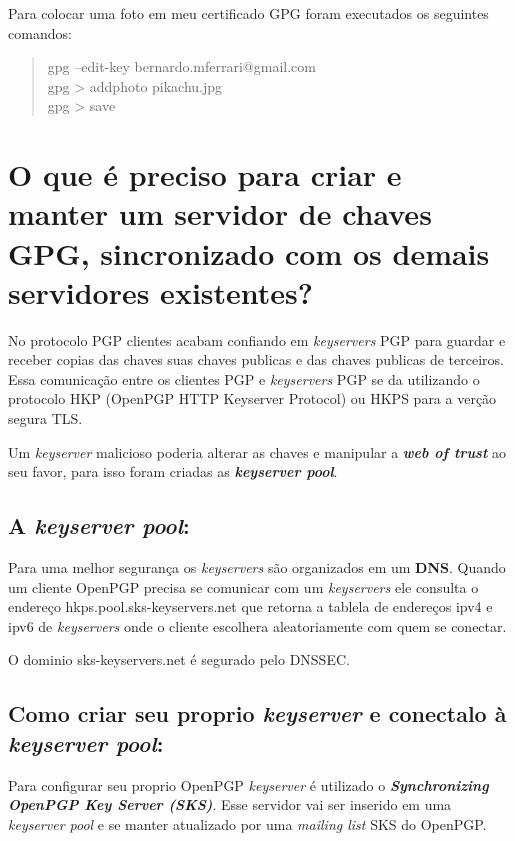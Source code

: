 \documentclass[12pt, letterpaper]{article}
\begin{document}
Para colocar uma foto em meu certificado GPG foram executados os seguintes comandos:
\begin{quote}
  gpg --edit-key bernardo.mferrari@gmail.com \\
  gpg \textgreater{} addphoto pikachu.jpg \\
  gpg \textgreater{} save
\end{quote}

\section{O que é preciso para criar e manter um servidor de chaves GPG, sincronizado com os demais servidores existentes?}

No protocolo PGP clientes acabam confiando em \textit{keyservers} PGP para guardar e receber copias das chaves suas chaves
publicas e das chaves publicas de terceiros. Essa comunicação entre os clientes PGP e \textit{keyservers} PGP se da utilizando
o protocolo HKP (OpenPGP HTTP Keyserver Protocol) ou HKPS para a verção segura TLS\@.

Um \textit{keyserver} malicioso poderia alterar as chaves e manipular a \textit{\textbf{web of trust}} ao seu favor, para isso
foram criadas as \textit{\textbf{keyserver pool}}.

\subsection{A \textit{keyserver pool}:}

Para uma melhor segurança os \textit{keyservers} são organizados em um \textbf{DNS}.
Quando um cliente OpenPGP precisa se comunicar com um \textit{keyservers} ele consulta
o endereço hkps.pool.sks-keyservers.net que retorna a tablela de endereços ipv4 e ipv6
de \textit{keyservers} onde o cliente escolhera aleatoriamente com quem se conectar.

O dominio sks-keyservers.net é segurado pelo DNSSEC\@.

\subsection{Como criar seu proprio \textit{keyserver} e conectalo à \textit{keyserver pool}: }

Para configurar seu proprio OpenPGP \textit{keyserver} é utilizado o \textit{\textbf{Synchronizing OpenPGP Key Server (SKS)}}.
Esse servidor vai ser inserido em uma \textit{keyserver pool} e se manter atualizado por uma \textit{mailing list} SKS do OpenPGP\@.
\end{document}
